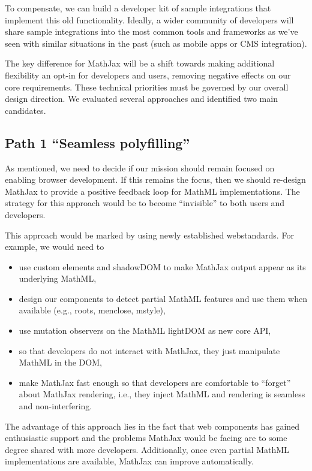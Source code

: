 \documentclass[]{amsart}
\begin{document}
To compensate, we can build a developer kit of sample integrations that
implement this old functionality. Ideally, a wider community of
developers will share sample integrations into the most common tools and
frameworks as we've seen with similar situations in the past (such as
mobile apps or CMS integration).

The key difference for MathJax will be a shift towards making additional
flexibility an opt-in for developers and users, removing negative
effects on our core requirements. These technical priorities must be
governed by our overall design direction. We evaluated several
approaches and identified two main candidates.

\subsection{\texorpdfstring{Path 1 ``Seamless
polyfilling''}{Path 1 Seamless polyfilling}}\label{path-1-seamless-polyfilling}

As mentioned, we need to decide if our mission should remain focused on
enabling browser development. If this remains the focus, then we should
re-design MathJax to provide a positive feedback loop for MathML
implementations. The strategy for this approach would be to become
``invisible'' to both users and developers.

This approach would be marked by using newly established webstandards.
For example, we would need to

\begin{itemize}
\itemsep1pt\parskip0pt
\item
  use custom elements and shadowDOM to make MathJax output appear as its
  underlying MathML,
\item
  design our components to detect partial MathML features and use them
  when available (e.g., roots, menclose, mstyle),
\item
  use mutation observers on the MathML lightDOM as new core API,
\item
  so that developers do not interact with MathJax, they just manipulate
  MathML in the DOM,
\item
  make MathJax fast enough so that developers are comfortable to
  ``forget'' about MathJax rendering, i.e., they inject MathML and
  rendering is seamless and non-interfering.
\end{itemize}

The advantage of this approach lies in the fact that web components has
gained enthusiastic support and the problems MathJax would be facing are
to some degree shared with more developers. Additionally, once even
partial MathML implementations are available, MathJax can improve
automatically.
\end{document}
